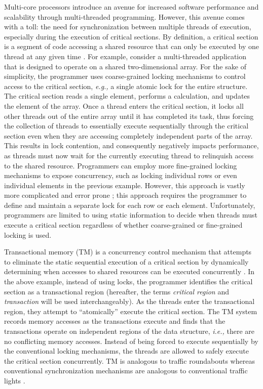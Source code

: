 \documentclass{sig-alternate}
\begin{document}
Multi-core processors introduce an avenue for increased software performance and
scalability through multi-threaded programming.  However, this avenue comes with a toll:
the need for synchronization between multiple threads of execution, especially
during the execution of critical sections.  By definition, a critical section is a segment
of code accessing a shared resource that can only be executed by one thread at any given
time \cite{os_concepts}.  For example, consider a multi-threaded application that is
designed to operate on a shared two-dimensional array.  For the sake of simplicity, the
programmer uses coarse-grained locking mechanisms to control access to the critical
section, \emph{e.g.,} a single atomic lock for the entire structure.  The critical section
reads a single element, performs a calculation, and updates the element of the array.
Once a thread enters the critical section, it locks all other threads out of the entire
array until it has completed its task, thus forcing the collection of threads to
essentially execute sequentially through the critical section even when they are accessing
completely independent parts of the array.  This results in lock contention, and
consequently negatively impacts performance, as threads must now wait for the currently
executing thread to relinquish access to the shared resource.  Programmers can employ more
fine-grained locking mechanisms to expose concurrency, such as locking individual rows or
even individual elements in the previous example.  However, this approach is vastly more
complicated and error prone \cite{sle_rajwar}; this approach requires the programmer to
define and maintain a separate lock for each row or each element.  Unfortunately,
programmers are limited to using static information to decide when threads must execute a
critical section regardless of whether coarse-grained or fine-grained locking is used.

Transactional memory (TM) is a concurrency control mechanism that attempts to eliminate
the static sequential execution of a critical section by dynamically determining when
accesses to shared resources can be executed concurrently \cite{sle_rajwar}.  In the above
example, instead of using locks, the programmer identifies the critical section as a
transactional region (hereafter, the terms \emph{critical region} and \emph{transaction}
will be used interchangeably).  As the threads enter the transactional region, they
attempt to ``atomically'' execute the critical section.  The TM system records memory
accesses as the transactions execute and finds that the transactions operate on
independent regions of the data structure, \emph{i.e.,} there are no conflicting memory
accesses.  Instead of being forced to execute sequentially by the conventional locking
mechanisms, the threads are allowed to safely execute the critical section concurrently.
TM is analogous to traffic roundabouts whereas conventional synchronization mechanisms are
analogous to conventional traffic lights \cite{neuling_vid}.
\end{document}
